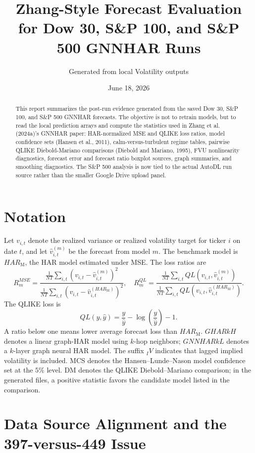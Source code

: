 \documentclass[11pt,a4paper]{article}
\title{\textbf{Zhang-Style Forecast Evaluation for Dow 30, S\&P 100, and S\&P 500 GNNHAR Runs}}
\author{Generated from local Volatility outputs}
\date{June 18, 2026}
\begin{document}
\maketitle

\begin{abstract}
This report summarizes the post-run evidence generated from the saved Dow 30, S\&P 100,
and S\&P 500 GNNHAR forecasts.  The objective is not to retrain models, but to read the
local prediction arrays and compute the statistics used in Zhang et al. (2024a)'s GNNHAR paper:
HAR-normalized MSE and QLIKE loss ratios, model confidence sets (Hansen et al., 2011), calm-versus-turbulent
regime tables, pairwise QLIKE Diebold-Mariano comparisons (Diebold and Mariano, 1995), FVU nonlinearity diagnostics,
forecast error and forecast ratio boxplot sources, graph summaries, and smoothing diagnostics.
The S\&P 500 analysis is now tied to the actual AutoDL run source rather than the smaller
Google Drive upload panel.
\end{abstract}


\section{Notation}
Let \(v_{i,t}\) denote the realized variance or realized volatility target for ticker \(i\) on
date \(t\), and let \(\widehat v_{i,t}^{(m)}\) be the forecast from model \(m\).
The benchmark model is \(HAR_{\mathrm{M}}\), the HAR model estimated under MSE.  The loss ratios are
\[
R^{MSE}_m =
\frac{\frac{1}{NT}\sum_{i,t}(v_{i,t}-\widehat v_{i,t}^{(m)})^2}
{\frac{1}{NT}\sum_{i,t}(v_{i,t}-\widehat v_{i,t}^{(HAR_{\mathrm{M}})})^2},
\quad
R^{QL}_m =
\frac{\frac{1}{NT}\sum_{i,t}QL(v_{i,t},\widehat v_{i,t}^{(m)})}
{\frac{1}{NT}\sum_{i,t}QL(v_{i,t},\widehat v_{i,t}^{(HAR_{\mathrm{M}})})}.
\]
The QLIKE loss is
\[
QL(y,\widehat y)=\frac{y}{\widehat y}-\log\!\left(\frac{y}{\widehat y}\right)-1.
\]
A ratio below one means lower average forecast loss than \(HAR_{\mathrm{M}}\).  \(GHARkH\) denotes a
linear graph-HAR model using \(k\)-hop neighbors; \(GNNHARkL\) denotes a \(k\)-layer graph
neural HAR model.  The suffix \(_IV\) indicates that lagged implied volatility is included.
MCS denotes the Hansen--Lunde--Nason model confidence set at the \(5\%\) level.  DM denotes
the QLIKE Diebold--Mariano comparison; in the generated files, a positive statistic favors the
candidate model listed in the comparison.


\section{Data Source Alignment and the 397-versus-449 Issue}
\end{document}
